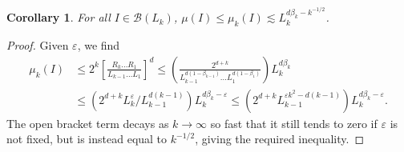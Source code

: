 \documentclass{article}
\theoremstyle{plain}
\newtheorem{corollary}{Corollary}
\theoremstyle{plain}
\begin{document}
\begin{corollary}
	For all $I \in \mathcal{B}(L_k)$, $\mu(I) \leq \mu_k(I) \lesssim L_k^{d \beta_k - k^{-1/2}}$.
\end{corollary}
\begin{proof}
	Given $\varepsilon$, we find
	\begin{align*}
		\mu_k(I) &\leq 2^k \left[ \frac{R_k \dots R_1}{L_{k-1} \dots L_1} \right]^d \leq \left( \frac{2^{d + k}}{L_{k-1}^{d(1 - \beta_{k-1})} \dots L_1^{d(1 - \beta_1)}} \right) L_k^{d \beta_k}\\
		&\leq \left( 2^{d + k} L_k^\varepsilon / L_{k-1}^{d(k-1)} \right) L_k^{d \beta_k - \varepsilon} \leq \left( 2^{d + k} L_{k-1}^{\varepsilon k^2 - d(k - 1)} \right) L_k^{d \beta_k - \varepsilon}.
	\end{align*}
	The open bracket term decays as $k \to \infty$ so fast that it still tends to zero if $\varepsilon$ is not fixed, but is instead equal to $k^{-1/2}$, giving the required inequality.
\end{proof}



\end{document}
